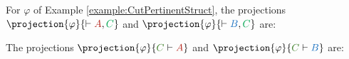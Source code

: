\begin{example}
\label{example:OProjections}
For $\varphi$ of Example \ref{example:CutPertinentStruct}, the projections $\projection{\varphi}{\seq \hA{A}, \hE{C}}$ and $\projection{\varphi}{\seq \hB{B}, \hE{C}}$ are:
\begin{small}
\begin{multicols}{2}{
\begin{prooftree}
	 
	 
							 
\end{prooftree}

\begin{prooftree}
	 
	 
							 
\end{prooftree}
}
\end{multicols}
\end{small}

\noindent
The projections $\projection{\varphi}{\hF{C} \seq \hA{A}}$ and $\projection{\varphi}{\hF{C} \seq \hB{B}}$ are:
\begin{small}
\begin{multicols}{2}{
\begin{prooftree}
 
 
								 
								 
\end{prooftree}

\begin{prooftree}
 
 
								 
								 
\end{prooftree}
}
\end{multicols}
\end{small}


\end{example}
